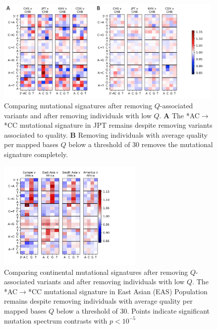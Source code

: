 \documentclass[9pt,article]{template}
\begin{document}
\begin{figure}[tbp]
\includegraphics[width=11cm,keepaspectratio]{MutationSpectrum_cutOff.png}
\caption{Comparing mutational signatures after removing $Q$-associated variants and after removing individuals with low $Q$.  
\textbf{A} 
The  *AC${\rightarrow}$*CC mutational signature in JPT remains despite removing variants associated to quality.
\textbf{B} 
Removing individuals with average quality per mapped bases $Q$ below a threshold of 30 removes the mutational signature completely. }
\label{MutSpect}
\end{figure}


\begin{figure}[tbp]
\includegraphics[width=7cm,keepaspectratio]{CutOffID_QUAL30_heatmap_v_AFR_nosingle.jpg}
\caption{Comparing continental mutational signatures after removing $Q$-associated variants and after removing individuals with low $Q$.  
The  *AC${\rightarrow}$*CC mutational signature in East Asian (EAS) Population remains despite removing individuals with average quality per mapped bases $Q$ below a threshold of 30.
Points indicate significant mutation spectrum contrasts with $p <10^{-5}$}
\label{MutSpect_continental}
\end{figure}
\end{document}
